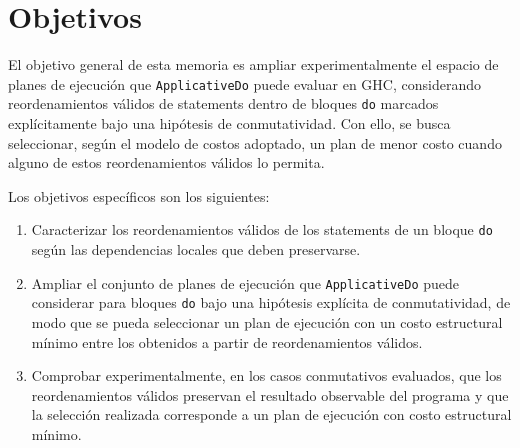 
\section{Objetivos}

El objetivo general de esta memoria es ampliar experimentalmente el espacio de planes de ejecución que \texttt{ApplicativeDo} puede evaluar en \textsf{GHC}, considerando reordenamientos válidos de statements dentro de bloques \texttt{do} marcados explícitamente bajo una hipótesis de conmutatividad. Con ello, se busca seleccionar, según el modelo de costos adoptado, un plan de menor costo cuando alguno de estos reordenamientos válidos lo permita.

Los objetivos específicos son los siguientes:

\begin{enumerate}
    \item Caracterizar los reordenamientos válidos de los statements de un bloque \texttt{do} según las dependencias locales que deben preservarse.
  \captionsetup{skip=14pt}
    \item Ampliar el conjunto de planes de ejecución que \texttt{ApplicativeDo} puede considerar para bloques \texttt{do} bajo una hipótesis explícita de conmutatividad, de modo que se pueda seleccionar un plan de ejecución con un costo estructural mínimo entre los obtenidos a partir de reordenamientos válidos.
    \item Comprobar experimentalmente, en los casos conmutativos evaluados, que los reordenamientos válidos preservan el resultado observable del programa y que la selección realizada corresponde a un plan de ejecución con costo estructural mínimo.
\end{enumerate}
